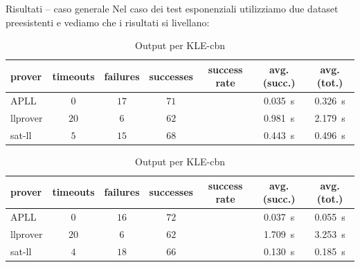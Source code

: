 \documentclass{beamer}
\begin{document}
\begin{frame}{Risultati -- caso generale}
	Nel caso dei test esponenziali utilizziamo due dataset preesistenti e vediamo che i risultati si livellano:
	\begin{table}[h!]
		\begin{subtable}{\textwidth}
			\centering
			{\footnotesize
			\begin{tabular}{ | l c c c c c c | }
				\hline
				\textbf{prover} & \textbf{timeouts} & \textbf{failures} & \textbf{successes} & \textbf{success rate} & \textbf{avg. (succ.)} & \textbf{avg. (tot.)} \\
				\hline
				\hline
				APLL     & $0$  & $17$ & $71$ & \color{darkbluestatale}{$\approx 0.80$} & \qty{0.035}{\second} & \qty{0.326}{\second} \\
				llprover & $20$ & $6$  & $62$ & \color{darkbluestatale}{$\approx 0.70$} & \qty{0.981}{\second} & \qty{2.179}{\second} \\
				sat-ll   & $5$  & $15$ & $68$ & \color{darkbluestatale}{$\approx 0.77$} & \qty{0.443}{\second} & \qty{0.496}{\second} \\
				\hline
			\end{tabular}
			}
			\caption{Output per KLE-cbv}
			\label{table:KLE-cbv}
		\end{subtable}
		\begin{subtable}{\textwidth}
			\centering
			{\footnotesize
			\begin{tabular}{ | l c c c c c c | }
				\hline
				\textbf{prover} & \textbf{timeouts} & \textbf{failures} & \textbf{successes} & \textbf{success rate} & \textbf{avg. (succ.)} & \textbf{avg. (tot.)} \\
				\hline
				\hline
				APLL     & $0$  & $16$ & $72$ & \color{darkbluestatale}{$\approx 0.80$} & \qty{0.037}{\second} & \qty{0.055}{\second} \\
				llprover & $20$ & $6$  & $62$ & \color{darkbluestatale}{$\approx 0.70$} & \qty{1.709}{\second} & \qty{3.253}{\second} \\
				sat-ll   & $4$  & $18$ & $66$ & \color{darkbluestatale}{$\approx 0.75$} & \qty{0.130}{\second} & \qty{0.185}{\second} \\
				\hline
			\end{tabular}
			}
			\caption{Output per KLE-cbn}
			\label{table:KLE-cbn}
		\end{subtable}
	\end{table}
\end{frame}


\backmatter[notitle]

\end{document}
